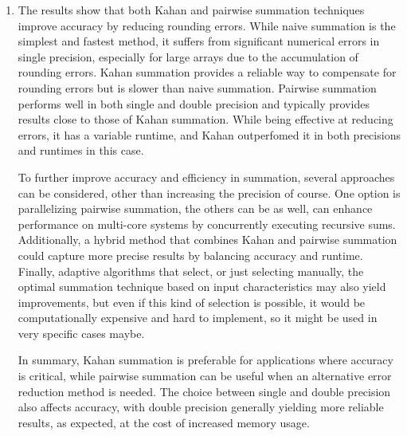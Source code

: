 \documentclass[11pt,a4paper, margin=1in]{article}
\begin{document}
\begin{enumerate}
    \item The results show that both Kahan and pairwise summation techniques improve accuracy by reducing rounding errors. While naive summation is the simplest and fastest method, it suffers from significant numerical errors in single precision, especially for large arrays due to the accumulation of rounding errors. Kahan summation provides a reliable way to compensate for rounding errors but is slower than naive summation. Pairwise summation performs well in both single and double precision and typically provides results close to those of Kahan summation. While being effective at reducing errors, it has a variable runtime, and Kahan outperfomed it in both precisions and runtimes in this case. 
    
    To further improve accuracy and efficiency in summation, several approaches can be considered, other than increasing the precision of course. One option is parallelizing pairwise summation, the others can be as well, can enhance performance on multi-core systems by concurrently executing recursive sums. Additionally, a hybrid method that combines Kahan and pairwise summation could capture more precise results by balancing accuracy and runtime. Finally, adaptive algorithms that select, or just selecting manually, the optimal summation technique based on input characteristics may also yield improvements, but even if this kind of selection is possible, it would be computationally expensive and hard to implement, so it might be used in very specific cases maybe.
    
    In summary, Kahan summation is preferable for applications where accuracy is critical, while pairwise summation can be useful when an alternative error reduction method is needed. The choice between single and double precision also affects accuracy, with double precision generally yielding more reliable results, as expected, at the cost of increased memory usage.

\end{enumerate}
\end{document}
